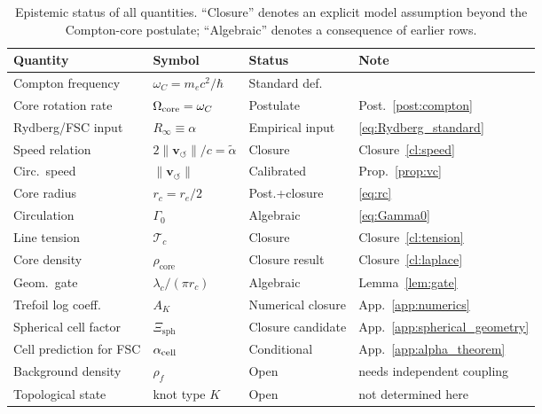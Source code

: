 \documentclass[aps,pra,preprint,longbibliography,nofootinbib]{revtex4-2}
\newcommand{\vnorm}{\lVert\mathbf{v}_{\!\boldsymbol{\circlearrowleft}}\rVert} %
\newcommand{\rhof}{\rho_{\!f}}                   %
\newcommand{\rhocore}{\rho_{\mathrm{core}}}      %
\newcommand{\rc}{r_c}                            %
\newcommand{\omC}{\omega_C}                      %
\newcommand{\lc}{\lambda_c}                      %
\newcommand{\Rinf}{R_\infty}                     %
\newcommand{\Tc}{\mathcal{T}_c}                  %
\newcommand{\Gz}{\Gamma_0}                       %
\newcommand{\AK}{A_K}                                %
\newcommand{\Xsph}{\Xi_{\mathrm{sph}}}             %
\begin{document}
\begin{table}[h]
\centering
\caption{Epistemic status of all quantities.  ``Closure'' denotes an
explicit model assumption beyond the Compton-core postulate; ``Algebraic''
denotes a consequence of earlier rows.}
\label{tab:status}
\begin{tabular}{llll}
\toprule
Quantity & Symbol & Status & Note \\
\midrule
Compton frequency  & $\omC = m_e c^2/\hbar$     & Standard def.  & \cite{MohrTaylor2022} \\
Core rotation rate & $\Omega_{\rm core}=\omC$   & Postulate       & Post.~\ref{post:compton} \\
Rydberg/FSC input  & $\Rinf\equiv\alpha$        & Empirical input & \eqref{eq:Rydberg_standard} \\
Speed relation     & $2\vnorm/c=\tilde\alpha$   & Closure         & Closure~\ref{cl:speed} \\
Circ.\ speed       & $\vnorm$                   & Calibrated      & Prop.~\ref{prop:vc} \\
Core radius        & $\rc = r_e/2$              & Post.+closure   & \eqref{eq:rc} \\
Circulation        & $\Gz$                      & Algebraic       & \eqref{eq:Gamma0} \\
Line tension       & $\Tc$                      & Closure         & Closure~\ref{cl:tension} \\
Core density       & $\rhocore$                 & Closure result  & Closure~\ref{cl:laplace} \\
Geom.\ gate        & $\lc/(\pi\rc)$             & Algebraic       & Lemma~\ref{lem:gate} \\
Trefoil log coeff. & $\AK$                      & Numerical closure & App.~\ref{app:numerics} \\
Spherical cell factor & $\Xsph$                 & Closure candidate & App.~\ref{app:spherical_geometry} \\
Cell prediction for FSC & $\alpha_{\rm cell}$    & Conditional     & App.~\ref{app:alpha_theorem} \\
Background density & $\rhof$                    & Open            & needs independent coupling \\
Topological state  & knot type $K$              & Open            & not determined here \\
\bottomrule
\end{tabular}
\end{table}
\end{document}
